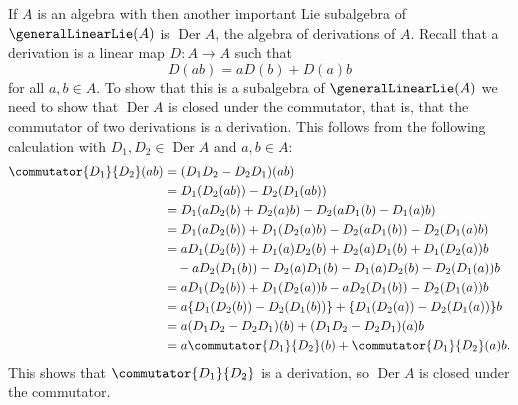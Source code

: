 \documentclass[fleqn]{NotesClass}
\DeclareMathOperator{\Der}{Der}
\begin{document}
    If \(A\) is an algebra with then another important Lie subalgebra of \(\generalLinearLie(A)\) is \(\Der A\), the algebra of derivations of \(A\).
    Recall that a derivation is a linear map \(D \colon A \to A\) such that
    \begin{equation}
        D(ab) = aD(b) + D(a)b
    \end{equation}
    for all \(a, b \in A\).
    To show that this is a subalgebra of \(\generalLinearLie(A)\) we need to show that \(\Der A\) is closed under the commutator, that is, that the commutator of two derivations is a derivation.
    This follows from the following calculation with \(D_1, D_2 \in \Der A\) and \(a, b \in A\):
    \begingroup
    \allowdisplaybreaks
    \begin{align}
        \commutator{D_1}{D_2}(ab) &= (D_1D_2 - D_2D_1)(ab)\\
        &= D_1(D_2(ab)) - D_2(D_1(ab)) \notag\\
        &= D_1(aD_2(b) + D_2(a)b) - D_2(aD_1(b) - D_1(a)b) \notag\\
        &= D_1(aD_2(b)) + D_1(D_2(a)b) - D_2(aD_1(b)) - D_2(D_1(a)b) \notag\\
        &= aD_1(D_2(b)) + D_1(a)D_2(b) + D_2(a)D_1(b) + D_1(D_2(a))b \notag\\
        &\quad- aD_2(D_1(b)) - D_2(a)D_1(b) - D_1(a)D_2(b) - D_2(D_1(a))b \notag\\
        &= aD_1(D_2(b)) + D_1(D_2(a))b - aD_2(D_1(b)) - D_2(D_1(a))b \notag\\
        &= a\{D_1(D_2(b)) - D_2(D_1(b))\} + \{D_1(D_2(a)) - D_2(D_1(a))\}b \notag\\
        &= a(D_1D_2 - D_2D_1)(b) + (D_1D_2 - D_2D_1)(a)b \notag\\
        &= a\commutator{D_1}{D_2}(b) + \commutator{D_1}{D_2}(a)b. \notag
    \end{align}
    \endgroup
    This shows that \(\commutator{D_1}{D_2}\) is a derivation, so \(\Der A\) is closed under the commutator.
    
	
%	
	
\end{document}
